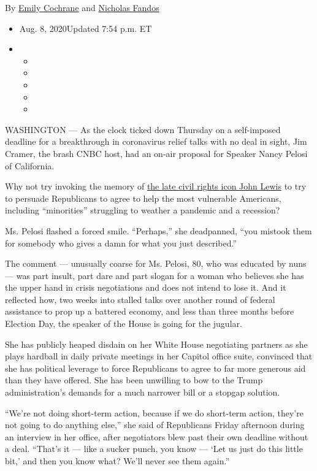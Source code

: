 By \href{https://www.nytimes.com/by/emily-cochrane}{Emily Cochrane} and
\href{https://www.nytimes.com/by/nicholas-fandos}{Nicholas Fandos}

\begin{itemize}
\item
  Aug. 8, 2020Updated 7:54 p.m. ET
\item
  \begin{itemize}
  \item
  \item
  \item
  \item
  \item
  \end{itemize}
\end{itemize}

WASHINGTON --- As the clock ticked down Thursday on a self-imposed
deadline for a breakthrough in coronavirus relief talks with no deal in
sight, Jim Cramer, the brash CNBC host, had an on-air proposal for
Speaker Nancy Pelosi of California.

Why not try invoking the memory of
\href{https://www.nytimes.com/2020/07/17/us/john-lewis-dead.html}{the
late civil rights icon John Lewis} to try to persuade Republicans to
agree to help the most vulnerable Americans, including ``minorities''
struggling to weather a pandemic and a recession?

Ms. Pelosi flashed a forced smile. ``Perhaps,'' she deadpanned, ``you
mistook them for somebody who gives a damn for what you just
described.''

The comment --- unusually coarse for Ms. Pelosi, 80, who was educated by
nuns --- was part insult, part dare and part slogan for a woman who
believes she has the upper hand in crisis negotiations and does not
intend to lose it. And it reflected how, two weeks into stalled talks
over another round of federal assistance to prop up a battered economy,
and less than three months before Election Day, the speaker of the House
is going for the jugular.

She has publicly heaped disdain on her White House negotiating partners
as she plays hardball in daily private meetings in her Capitol office
suite, convinced that she has political leverage to force Republicans to
agree to far more generous aid than they have offered. She has been
unwilling to bow to the Trump administration's demands for a much
narrower bill or a stopgap solution.

``We're not doing short-term action, because if we do short-term action,
they're not going to do anything else,'' she said of Republicans Friday
afternoon during an interview in her office, after negotiators blew past
their own deadline without a deal. ``That's it --- like a sucker punch,
you know --- `Let us just do this little bit,' and then you know what?
We'll never see them again.''

